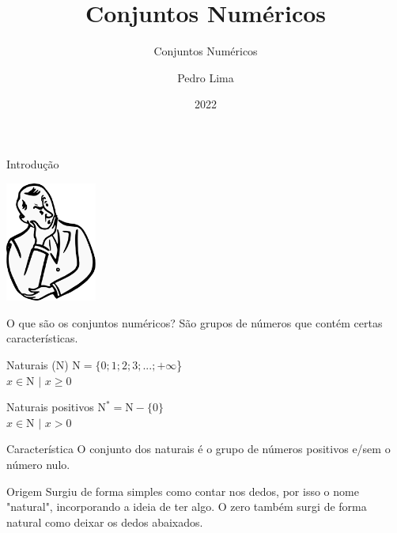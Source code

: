 \documentclass{beamer}
\title{Conjuntos Numéricos}
\subtitle{Conjuntos Numéricos}
\author{Pedro Lima}
\institute{PLmatemática}
\date{2022}
\begin{document}
    \maketitle
    
    \begin{frame}{Introdução}
        \begin{center}
            \includegraphics[width=3cm]{imagens/images.png}
        \end{center}
        \begin{block}{O que são os conjuntos numéricos?}
            São grupos de números que contém certas características.
        \end{block}
    \end{frame}
    
    \begin{frame}{Naturais ($\mathrm{N}$)}
        $\mathrm{N} = \{0; 1; 2; 3; ... ; +\infty$\}\\
        $x \in \mathrm{N}$ $|$ $x \ge 0$\\
        \begin{alertblock}{Naturais positivos}
            $\mathrm{N}^* = \mathrm{N} - \{0\}$\\
            $x \in \mathrm{N}$ $|$ $x > 0$
        \end{alertblock}
        \begin{block}{Característica}
            O conjunto dos naturais é o grupo de números positivos e/sem o número nulo.
        \end{block}
        \begin{block}{Origem}
            Surgiu de forma simples como contar nos dedos, por isso o nome "natural", incorporando a ideia de ter algo. O zero também surgi de forma natural como deixar os dedos abaixados.
        \end{block}
    \end{frame}
    
\end{document}
